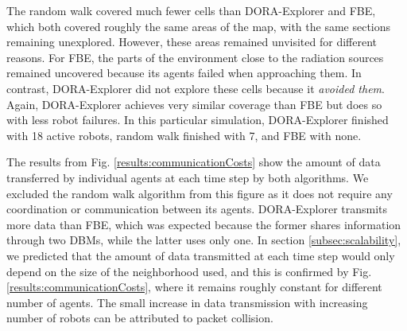
The random walk covered much fewer cells than DORA-Explorer and FBE, which both covered
roughly the same areas of the map, with the same sections remaining
unexplored. However, these areas remained unvisited for different
reasons. For FBE, the parts of the environment close to the radiation
sources remained uncovered because its agents failed when approaching
them. In contrast, DORA-Explorer did not explore these cells because it
\textit{avoided them}. Again, DORA-Explorer achieves very similar coverage than
FBE but does so with less robot failures. In this particular
simulation, DORA-Explorer finished with 18 active robots, random walk finished
with 7, and FBE with none.

The results from Fig. \ref{results:communicationCosts} show the amount
of data transferred by individual agents at each time step by both
algorithms. We excluded the random walk algorithm from this figure as
it does not require any coordination or communication between its
agents. DORA-Explorer transmits more data than FBE, which was expected because
the former shares information through two DBMs, while the latter uses
only one. In section \ref{subsec:scalability}, we predicted that the
amount of data transmitted at each time step would only depend on the
size of the neighborhood used, and this is confirmed by
Fig. \ref{results:communicationCosts}, where it remains roughly
constant for different number of agents. The small increase in data
transmission with increasing number of robots can be attributed to
packet collision. 

